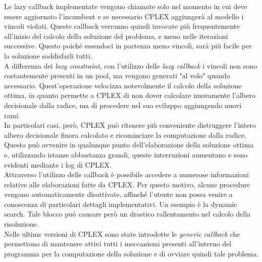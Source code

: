 Le lazy callback implementate vengono chiamate solo nel momento in cui deve essere aggiornato l'incumbent e se necessario CPLEX aggiungerà al modello i vincoli violati. Queste callback verranno quindi invocate più frequentemente all'inizio del calcolo della soluzione del problema, e meno nelle iterazioni successive. Questo poichè essendoci in partenza meno vincoli, sarà più facile per la soluzione soddisfarli tutti.\\
A differenza dei \textit{lazy constraint}, con l'utilizzo delle \textit{lazy callback} i vincoli non sono costantemente presenti in un pool, ma vengono generati "al volo" quando necessario.  Quest'operazione velocizza notevolmente il calcolo della soluzione ottima, in quanto permette a CPLEX di non dover calcolare nuovamente l'albero decisionale dalla radice, ma di procedere nel suo sviluppo aggiungendo nuovi rami.\\
In particolari casi, però, CPLEX può ritenere più conveniente distruggere l'intero albero decisionale finora calcolato e ricominciare la computazione dalla radice. Questo può avvenire in qualunque punto dell'elaborazione della soluzione ottima e, utilizzando istanze abbastanza grandi, queste interruzioni aumentano e sono evidenti mediante i log di CPLEX.\\
Attraverso l'utilizzo delle callback è possibile accedere a numerose informazioni relative alle elaborazioni fatte da CPLEX. Per questo motivo, alcune procedure vengono automaticamente disattivate, affinché l'utente non possa venire a conoscenza di particolari dettagli implementativi. Un esempio è la dynamic search. Tale blocco può causare però un drastico rallentamento nel calcolo della risoluzione.\\
Nelle ultime versioni di CPLEX sono state introdotte le \textit{generic callback} che permettono di mantenere attivi tutti i meccanismi presenti all'interno del programma per la computazione della soluzione e di ovviare quindi tale problema.  
